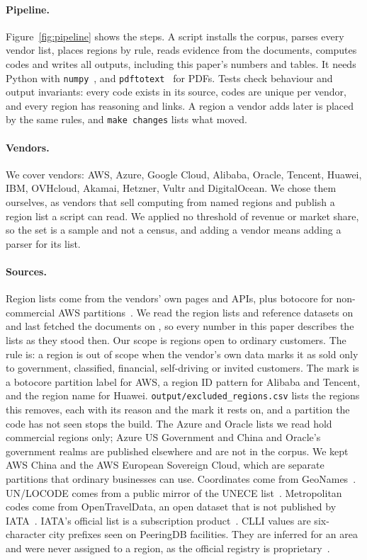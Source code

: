 \documentclass[10pt,twocolumn]{article}
\newcommand{\code}[1]{\texttt{#1}}
\begin{document}
\paragraph{Pipeline.} Figure~\ref{fig:pipeline} shows the steps. A script installs the corpus, parses every vendor list, places regions by rule, reads evidence from the documents, computes codes and writes all outputs, including this paper's numbers and tables. It needs Python with \code{numpy}~\citep{harris2020numpy}, and \code{pdftotext}~\citep{poppler} for PDFs. Tests check behaviour and output invariants: every code exists in its source, codes are unique per vendor, and every region has reasoning and links. A region a vendor adds later is placed by the same rules, and \code{make changes} lists what moved.

\paragraph{Vendors.} We cover \providerCount{} vendors: AWS, Azure, Google Cloud, Alibaba, Oracle, Tencent, Huawei, IBM, OVHcloud, Akamai, Hetzner, Vultr and DigitalOcean. We chose them ourselves, as vendors that sell computing from named regions and publish a region list a script can read. We applied no threshold of revenue or market share, so the set is a sample and not a census, and adding a vendor means adding a parser for its list.

\paragraph{Sources.} Region lists come from the vendors' own pages and APIs, plus botocore for non-commercial AWS partitions~\citep{botocore_endpoints}. We read the region lists and reference datasets on \listsRetrieved{} and last fetched the documents on \documentsRetrieved{}, so every number in this paper describes the lists as they stood then. Our scope is regions open to ordinary customers. The rule is: a region is out of scope when the vendor's own data marks it as sold only to government, classified, financial, self-driving or invited customers. The mark is a botocore partition label for AWS, a region ID pattern for Alibaba and Tencent, and the region name for Huawei. \code{output/excluded\_regions.csv} lists the \excludedCount{} regions this removes, each with its reason and the mark it rests on, and a partition the code has not seen stops the build. The Azure and Oracle lists we read hold commercial regions only; Azure US Government and China and Oracle's government realms are published elsewhere and are not in the corpus. We kept AWS China and the AWS European Sovereign Cloud, which are separate partitions that ordinary businesses can use. Coordinates come from GeoNames~\citep{geonames_readme}. UN/LOCODE comes from a public mirror of the UNECE list~\citep{datasets_unlocode}. Metropolitan codes come from OpenTravelData, an open dataset that is not published by IATA~\citep{opentraveldata}. IATA's official list is a subscription product~\citep{iata_location_database}. CLLI values are six-character city prefixes seen on PeeringDB facilities. They are inferred for an area and were never assigned to a region, as the official registry is proprietary~\citep{iconectiv_ip_faq}.
\end{document}

